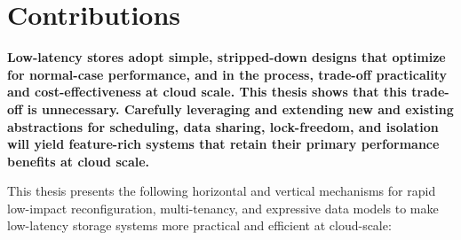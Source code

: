 %

\section{Contributions}

{\bf
  Low-latency stores adopt simple, stripped-down designs that optimize
  for normal-case performance, and in the process, trade-off
  practicality and cost-effectiveness at cloud scale.
%
  This thesis shows that this trade-off is unnecessary. Carefully
  leveraging and extending new and existing abstractions for scheduling,
  data sharing, lock-freedom, and isolation will yield feature-rich
  systems that
  retain their primary performance benefits at cloud scale.
}

This thesis presents the following horizontal and vertical mechanisms
for rapid low-impact reconfiguration, multi-tenancy, and expressive data
models to make low-latency storage systems more practical and efficient
at cloud-scale:

